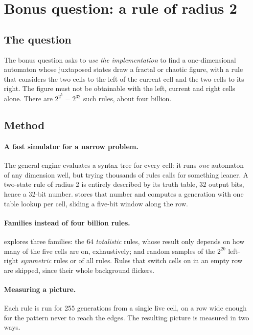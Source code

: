 \section{Bonus question: a rule of radius 2}
\label{sec:bonus}

\subsection{The question}

The bonus question asks to \emph{use the implementation} to find a one-dimensional automaton
whose juxtaposed states draw a fractal or chaotic figure, with a rule that considers the two
cells to the left of the current cell and the two cells to its right. The figure must not be
obtainable with the left, current and right cells alone. There are $2^{2^5} = 2^{32}$ such rules,
about four billion.

\subsection{Method}

\paragraph{A fast simulator for a narrow problem.} The general engine evaluates a syntax tree
for every cell: it runs \emph{one} automaton of any dimension well, but trying thousands of rules
calls for something leaner. A two-state rule of radius 2 is entirely described by its truth
table, 32 output bits, hence a 32-bit number.  stores that number and computes a
generation with one table lookup per cell, sliding a five-bit window along the row.

\paragraph{Families instead of four billion rules.}  explores three families:
the 64 \emph{totalistic} rules, whose result only depends on how many of the five cells are on,
exhaustively; and random samples of the $2^{20}$ left-right \emph{symmetric} rules or of all
rules. Rules that switch cells on in an empty row are skipped, since their whole background
flickers.

\paragraph{Measuring a picture.} Each rule is run for 255 generations from a single live cell,
on a row wide enough for the pattern never to reach the edges. The resulting picture is measured
in two ways.


